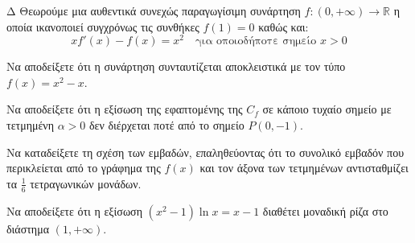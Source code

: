 \begin{thema}{Δ}
Θεωρούμε μια αυθεντικά συνεχώς παραγωγίσιμη συνάρτηση $f: (0,+\infty) \to \mathbb{R}$ η οποία ικανοποιεί συγχρόνως τις συνθήκες $f(1)=0$ καθώς και:
\[ x f'(x) - f(x) = x^2 \quad \text{για οποιοδήποτε σημείο } x>0 \]
\begin{erwthma}
    \item Να αποδείξετε ότι η συνάρτηση συνταυτίζεται αποκλειστικά με τον τύπο $f(x) = x^2 - x$. 
    \item Να αποδείξετε ότι η εξίσωση της εφαπτομένης της $C_f$ σε κάποιο τυχαίο σημείο με τετμημένη $\alpha > 0$ δεν διέρχεται ποτέ από το σημείο $P(0, -1)$. 
    \item Να καταδείξετε τη σχέση των εμβαδών, επαληθεύοντας ότι το συνολικό εμβαδόν που περικλείεται από το γράφημα της $f(x)$ και τον άξονα των τετμημένων αντισταθμίζει τα $\frac{1}{6}$ τετραγωνικών μονάδων. 
    \item Να αποδείξετε ότι η εξίσωση $(x^2-1)\ln x = x - 1$ διαθέτει μοναδική ρίζα στο διάστημα $(1, +\infty)$. 
\end{erwthma}
\end{thema}
